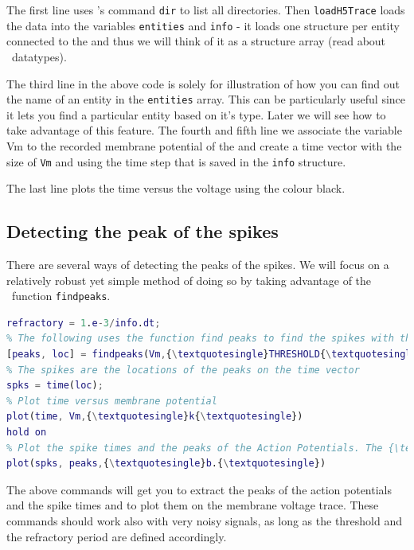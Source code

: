 The first line uses \matlab 's command \texttt{dir} to list all directories. Then \texttt{loadH5Trace} loads the data into the variables \texttt{entities} and \texttt{info} -  it loads one structure per entity connected to the  and thus we will think of it as a structure array (read about \matlab\ datatypes).

The third line in the above code is solely for illustration of how you can find out the name of an entity in the \texttt{entities} array. This can be particularly useful since it lets you find a particular entity based on it's type. Later we will see how to take advantage of this feature.
The fourth and fifth line we associate the variable Vm to the recorded membrane potential of the  and create a time vector with the size of \texttt{Vm} and using the time step that is saved in the \texttt{info} structure.

The last line plots the time versus the voltage using the colour black.

\subsection{Detecting the peak of the spikes}

There are several ways of detecting the peaks of the spikes. We will focus on a relatively robust yet simple method of doing so by taking advantage of the \matlab\ function \texttt{findpeaks}.

\begin{lstlisting}[language=matlab,morekeywords={findpeaks,THRESHOLD,MINPEAKDISTANCE},escapeinside=\{\}]
% Define the refractory period of the peak detector (1ms); this can be useful when dealing with noisy signals.
refractory = 1.e-3/info.dt; 
% The following uses the function find peaks to find the spikes with threshold crossing at 0mV and a refractory period. 
[peaks, loc] = findpeaks(Vm,{\textquotesingle}THRESHOLD{\textquotesingle},0,{\textquotesingle}MINPEAKDISTANCE{\textquotesingle},refractory);
% The spikes are the locations of the peaks on the time vector
spks = time(loc);
% Plot time versus membrane potential
plot(time, Vm,{\textquotesingle}k{\textquotesingle})
hold on
% Plot the spike times and the peaks of the Action Potentials. The {\textquotesingle}hold on{\textquotesingle} command makes that the plots overlap.
plot(spks, peaks,{\textquotesingle}b.{\textquotesingle})
\end{lstlisting}

The above commands will get you to extract the peaks of the action potentials and the spike times and to plot them on the membrane voltage trace.
These commands should work also with very noisy signals, as long as the threshold and the refractory period are defined accordingly.
